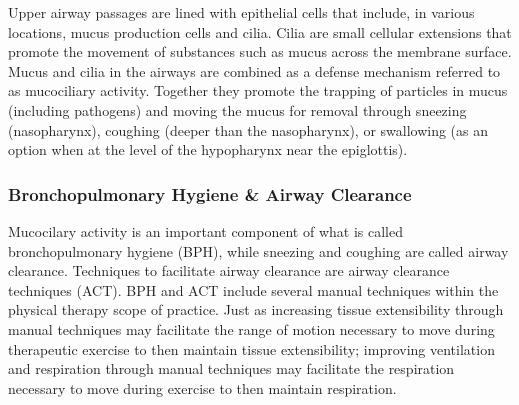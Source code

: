 Upper airway passages are lined with epithelial cells that include, in various locations, mucus production cells and cilia. Cilia are small cellular extensions that promote the movement of substances such as mucus across the membrane surface. Mucus and cilia in the airways are combined as a defense mechanism referred to as mucociliary activity. Together they promote the trapping of particles in mucus (including pathogens) and moving the mucus for removal through sneezing (nasopharynx), coughing (deeper than the nasopharynx), or swallowing (as an option when at the level of the hypopharynx near the epiglottis). 

\subsubsection{Bronchopulmonary Hygiene \& Airway Clearance}
Mucocilary activity is an important component of what is called bronchopulmonary hygiene (BPH), while sneezing and coughing are called airway clearance. Techniques to facilitate airway clearance are airway clearance techniques (ACT). BPH and ACT include several manual techniques within the physical therapy scope of practice.\footnotemark{} Just as increasing tissue extensibility through manual techniques may facilitate the range of motion necessary to move during therapeutic exercise to then maintain tissue extensibility; improving ventilation and respiration through manual techniques may facilitate the respiration necessary to move during exercise to then maintain respiration.  

